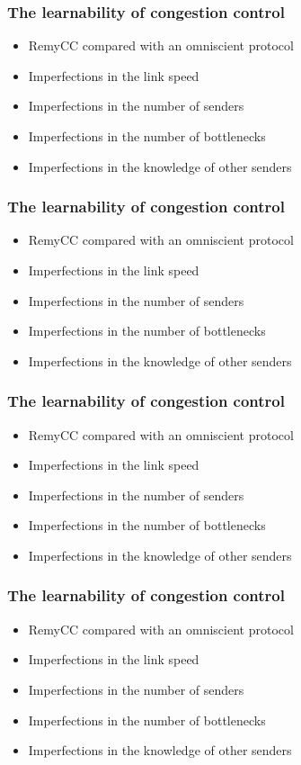 \documentclass[svgnames]{beamer}
\begin{document}
\begin{Large}
\begin{frame}
\frametitle{The learnability of congestion control}
\begin{itemize}
\item RemyCC compared with an omniscient protocol
\item Imperfections in the link speed
\item Imperfections in the number of senders
\item Imperfections in the number of bottlenecks
\item Imperfections in the knowledge of other senders
\end{itemize}
\end{frame}

\begin{frame}
\frametitle{The learnability of congestion control}
\begin{itemize}
\item RemyCC compared with an omniscient protocol
\item Imperfections in the link speed
\item Imperfections in the number of senders
\item Imperfections in the number of bottlenecks
\item Imperfections in the knowledge of other senders
\end{itemize}
\end{frame}



\begin{frame}
\frametitle{The learnability of congestion control}
\begin{itemize}
\item RemyCC compared with an omniscient protocol
\item Imperfections in the link speed
\item Imperfections in the number of senders
\item Imperfections in the number of bottlenecks
\item Imperfections in the knowledge of other senders
\end{itemize}
\end{frame}



\begin{frame}
\frametitle{The learnability of congestion control}
\begin{itemize}
\item RemyCC compared with an omniscient protocol
\item Imperfections in the link speed
\item Imperfections in the number of senders
\item Imperfections in the number of bottlenecks
\item Imperfections in the knowledge of other senders
\end{itemize}
\end{frame}


\end{Large}
\end{document}
